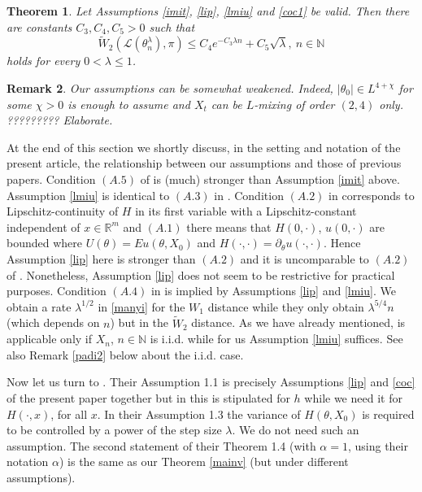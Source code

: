 \documentclass[a4paper,draft]{article}
\newtheorem{theorem}{Theorem}[section]
\newtheorem{remark}[theorem]{Remark}
\begin{document}
\begin{theorem}\label{mainw} Let Assumptions \ref{imit}, \ref{lip}, \ref{lmiu} and \ref{coc1}
be valid. Then there are constants
$C_3,C_4,C_5>0$ such that
\begin{equation}\label{mennyi}
\tilde{W}_2(\mathcal{L}(\theta^{\lambda}_n),\pi)\leq C_4 e^{-C_3\lambda n} +C_5\sqrt{\lambda},\ n\in\mathbb{N}
\end{equation}
holds for every $0<\lambda\leq 1$.
\end{theorem}

\begin{remark}{\rm Our assumptions can be somewhat weakened. Indeed,
$|\theta_0|\in L^{4+\chi}$ for some $\chi>0$ is enough to assume and $X_t$ can be $L$-mixing of
order $(2,4)$ only. ????????? Elaborate.}
\end{remark}

At the end of this section we shortly discuss, in the setting and notation of the present article,
the relationship between our assumptions and those of
previous papers. Condition $(A.5)$ of \cite{raginsky} is (much) stronger than Assumption \ref{imit}
above. Assumption \ref{lmiu} is identical to $(A.3)$ in \cite{raginsky}.
Condition $(A.2)$ in \cite{raginsky} corresponds to Lipschitz-continuity of $H$
in its first variable with a Lipschitz-constant independent of $x\in\mathbb{R}^m$
and $(A.1)$ there means that $H(0,\cdot)$, $u(0,\cdot)$ are bounded
where $U(\theta)=Eu(\theta,X_0)$ and $H(\cdot,\cdot)=\partial_{\theta}u(\cdot,\cdot)$.
Hence Assumption \ref{lip} here is stronger than $(A.2)$ and it is uncomparable to $(A.2)$ of \cite{raginsky}.
Nonetheless, Assumption \ref{lip} does not seem to be restrictive for practical purposes.
Condition $(A.4)$ in \cite{raginsky} is implied by Assumptions \ref{lip} and \ref{lmiu}.
We obtain a rate $\lambda^{1/2}$ in \eqref{manyi} for the $W_1$
distance while they only obtain $\lambda^{5/4}n$ (which depends on $n$)
but in the $\tilde{W}_2$ distance. As we have already mentioned, \cite{raginsky} is applicable
only if $X_n$, $n\in\mathbb{N}$ is i.i.d. while for us Assumption \ref{lmiu} suffices. See
also Remark \ref{padi2} below about the i.i.d. case.

Now let us turn to \cite{alex}. Their Assumption 1.1 is precisely Assumptions \ref{lip} and
\ref{coc} of the present paper together but in \cite{alex} this is stipulated for $h$
while we need it for $H(\cdot,x)$, for all $x$. In their Assumption 1.3 the variance of $H(\theta,X_0)$
is required to be controlled by a power of the step size $\lambda$. We do not need
such an assumption. The second statement of their
Theorem 1.4 (with $\alpha=1$, using their notation $\alpha$) is the same as our Theorem \ref{mainv}
(but under different assumptions).
\end{document}

